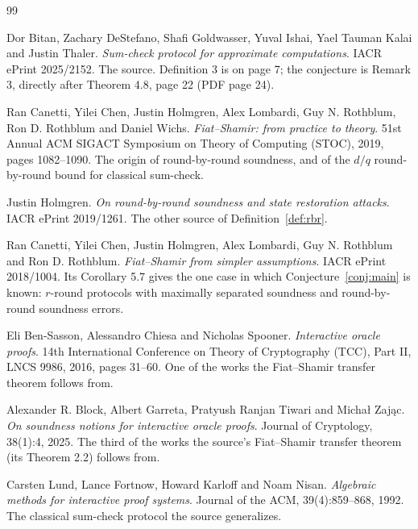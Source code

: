 \documentclass{aicr-conjecture}
\begin{document}
\begin{aicrbibliography}{99}

Dor Bitan, Zachary DeStefano, Shafi Goldwasser, Yuval Ishai, Yael Tauman
Kalai and Justin Thaler.
\emph{Sum-check protocol for approximate computations}.
IACR ePrint 2025/2152.
The source. Definition 3 is on page 7; the conjecture is Remark 3,
directly after Theorem 4.8, page 22 (PDF page 24).

Ran Canetti, Yilei Chen, Justin Holmgren, Alex Lombardi, Guy N. Rothblum,
Ron D. Rothblum and Daniel Wichs.
\emph{Fiat--Shamir: from practice to theory}.
51st Annual ACM SIGACT Symposium on Theory of Computing (STOC), 2019,
pages 1082--1090.
The origin of round-by-round soundness, and of the $d/q$ round-by-round
bound for classical sum-check.

Justin Holmgren.
\emph{On round-by-round soundness and state restoration attacks}.
IACR ePrint 2019/1261.
The other source of Definition~\ref{def:rbr}.

Ran Canetti, Yilei Chen, Justin Holmgren, Alex Lombardi, Guy N. Rothblum
and Ron D. Rothblum.
\emph{Fiat--Shamir from simpler assumptions}.
IACR ePrint 2018/1004.
Its Corollary 5.7 gives the one case in which
Conjecture~\ref{conj:main} is known: $r$-round protocols with maximally
separated soundness and round-by-round soundness errors.

Eli Ben-Sasson, Alessandro Chiesa and Nicholas Spooner.
\emph{Interactive oracle proofs}.
14th International Conference on Theory of Cryptography (TCC), Part II,
LNCS 9986, 2016, pages 31--60.
One of the works the Fiat--Shamir transfer theorem follows from.

Alexander R. Block, Albert Garreta, Pratyush Ranjan Tiwari and
Micha\l{} Zaj\k{a}c.
\emph{On soundness notions for interactive oracle proofs}.
Journal of Cryptology, 38(1):4, 2025.
The third of the works the source's Fiat--Shamir transfer theorem (its
Theorem 2.2) follows from.

Carsten Lund, Lance Fortnow, Howard Karloff and Noam Nisan.
\emph{Algebraic methods for interactive proof systems}.
Journal of the ACM, 39(4):859--868, 1992.
The classical sum-check protocol the source generalizes.

\end{aicrbibliography}
\end{document}
